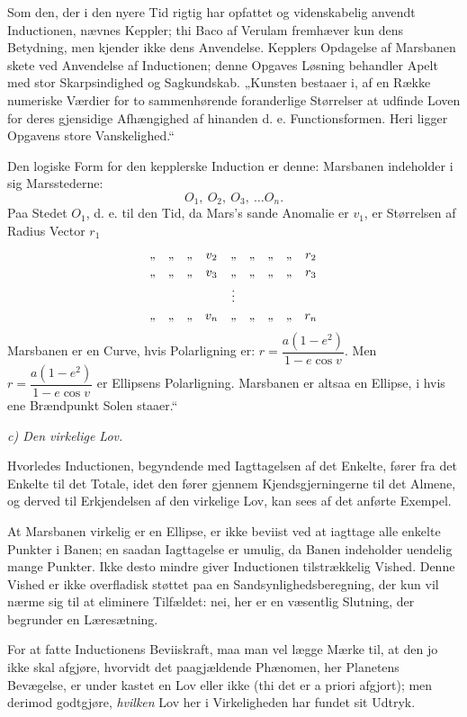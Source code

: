\documentclass[12pt]{book}
\newcommand{\opage}[1]{\marginnote{\footnotesize\textit{[#1]}}}
\begin{document}
Som den, der i den nyere Tid rigtig har opfattet og videnskabelig anvendt
Inductionen, nævnes Keppler; thi Baco af Verulam fremhæver kun dens Betydning, men
kjender ikke dens Anvendelse. Kepplers Opdagelse af Marsbanen skete ved Anvendelse af
Inductionen; denne Opgaves Løsning behandler Apelt med stor Skarpsindighed og
Sagkundskab. „Kunsten bestaaer i, af en Række numeriske Værdier for to sammenhørende
foranderlige Størrelser at udfinde Loven for deres gjensidige Afhængighed af hinanden
d. e. Functionsformen. Heri ligger Opgavens store Vanskelighed.“

\opage{58} Den logiske Form for den kepplerske Induction er denne: Marsbanen indeholder i sig
Marsstederne:
\[ O_1,\ O_2,\ O_3,\ \ldots O_n. \]
Paa Stedet $O_1$, d. e. til den Tid, da Mars's sande Anomalie er $v_1$, er Størrelsen
af Radius Vector $r_1$
\[
\begin{array}{ccccccccc}
\text{,,}&\text{,,}&\text{,,}& v_2 &\text{,,}&\text{,,}&\text{,,}&\text{,,}& r_2\\[2pt]
\text{,,}&\text{,,}&\text{,,}& v_3 &\text{,,}&\text{,,}&\text{,,}&\text{,,}& r_3\\[2pt]
\multicolumn{9}{c}{\vdots}\\[2pt]
\text{,,}&\text{,,}&\text{,,}& v_n &\text{,,}&\text{,,}&\text{,,}&\text{,,}& r_n\\
\end{array}
\]
Marsbanen er en Curve, hvis Polarligning er: $r = \dfrac{a(1-e^2)}{1-e\cos v}$. Men
$r = \dfrac{a(1-e^2)}{1-e\cos v}$ er Ellipsens Polarligning. Marsbanen er altsaa en
Ellipse, i hvis ene Brændpunkt Solen staaer.“

\emph{c) Den virkelige Lov.}

Hvorledes Inductionen, begyndende med Iagttagelsen af det Enkelte, fører fra det
Enkelte til det Totale, idet den fører gjennem Kjendsgjerningerne til det Almene, og
derved til Erkjendelsen af den virkelige Lov, kan sees af det anførte Exempel.

At Marsbanen virkelig er en Ellipse, er ikke beviist ved at iagttage alle enkelte
Punkter i Banen; en saadan Iagttagelse er umulig, da Banen indeholder uendelig mange
Punkter. Ikke desto mindre giver Inductionen tilstrækkelig Vished. Denne Vished er
ikke overfladisk støttet paa en Sandsynlighedsberegning, der kun vil nærme sig til at
eliminere Tilfældet: nei, her er en væsentlig Slutning, der begrunder en Læresætning.

For at fatte Inductionens Beviiskraft, maa man vel lægge Mærke til, at den jo ikke
skal afgjøre, hvorvidt det paagjældende Phænomen, her Planetens Bevægelse, er under%
\opage{59}kastet en Lov eller ikke (thi det er a priori afgjort); men derimod godtgjøre,
\emph{hvilken} Lov her i Virkeligheden har fundet sit Udtryk.
\end{document}
